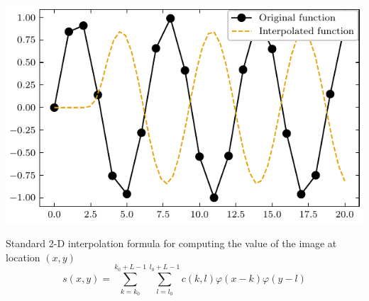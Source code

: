 \documentclass[]{usiinfbachelorproject}
\begin{document}
	\begin{center}
		\includegraphics{"images/cubic_interpolation_example.pdf"}
	\end{center}
	
	Standard 2-D interpolation formula for computing the value of the image at location $(x,y)$
	\begin{equation}
		s(x,y) = \sum_{k = k_0}^{k_0+L-1}\sum_{l=l_0}^{l_0+L-1} c(k,l)\varphi(x-k)\varphi(y-l)
	\end{equation}
	
	\fi
	
\end{document}
